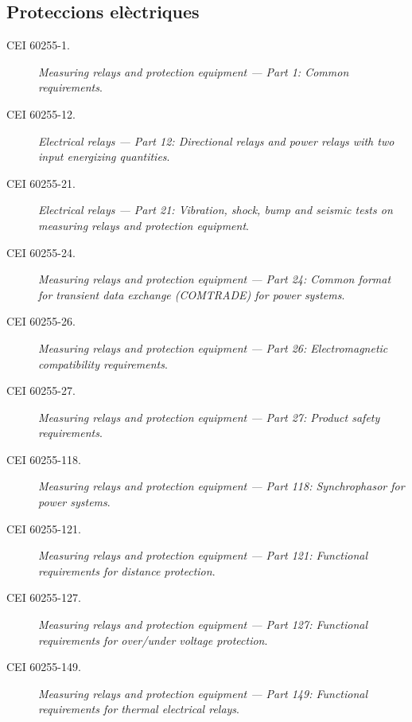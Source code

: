 \subsection*{Proteccions elèctriques}
\begin{description}
	\item [\hspace{5mm}CEI 60255-1.] \textit{Measuring relays and protection equipment --- Part 1: Common requirements}.
	\item [\hspace{5mm}CEI 60255-12.] \textit{Electrical relays --- Part 12: Directional relays and power relays with two input energizing quantities}.
	\item [\hspace{5mm}CEI 60255-21.] \textit{Electrical relays --- Part 21: Vibration, shock, bump and seismic tests on measuring relays and protection equipment}.
	\item [\hspace{5mm}CEI 60255-24.] \textit{Measuring relays and protection equipment --- Part 24: Common format for transient data exchange (COMTRADE) for power systems}.
	\item [\hspace{5mm}CEI 60255-26.] \textit{Measuring relays and protection equipment --- Part 26: Electromagnetic compatibility requirements}.
	\item [\hspace{5mm}CEI 60255-27.] \textit{Measuring relays and protection equipment --- Part 27: Product safety requirements}.
	\item [\hspace{5mm}CEI 60255-118.] \textit{Measuring relays and protection equipment --- Part 118: Synchrophasor for power systems}.
	\item [\hspace{5mm}CEI 60255-121.] \textit{Measuring relays and protection equipment --- Part 121: Functional requirements for distance protection}.
	\item [\hspace{5mm}CEI 60255-127.] \textit{Measuring relays and protection equipment --- Part 127: Functional requirements for over/under voltage protection}.
	\item [\hspace{5mm}CEI 60255-149.] \textit{Measuring relays and protection equipment --- Part 149:  Functional requirements for thermal electrical relays}.

\end{description}
